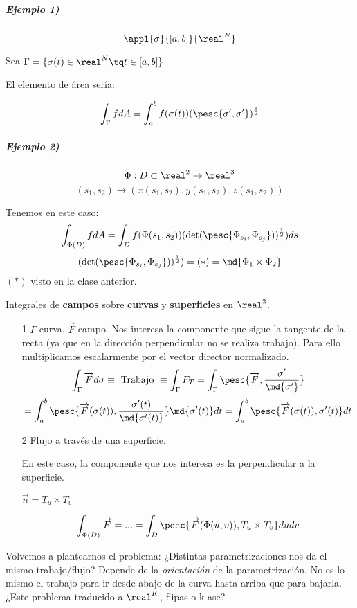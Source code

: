 \subparagraph{Ejemplo 1)}

\[\appl{\sigma}{[a,b]}{\real^N}\]

Sea $\Gamma = \{\sigma(t)\in\real^N\tq t\in[a,b]\}$

El elemento de área sería:

\[\int_{\Gamma} fdA = \int_a^bf(\sigma(t)) (\pesc{\sigma',\sigma'})^{\frac{1}{2}}\]


\subparagraph{Ejemplo 2)}

\[
\Phi : D\subset\real^2\rightarrow \real^3\]
\[(s_1,s_2)\rightarrow (x(s_1,s_2),y(s_1,s_2),z(s_1,s_2))\]

Tenemos en este caso:
\[\int_{\Phi(D)}fdA = \int_D f(\Phi(s_1,s_2)) (\det(\pesc{\Phi_{s_i},\Phi_{s_j}}))^{\frac{1}{2}})ds\]
\[(\det(\pesc{\Phi_{s_i},\Phi_{s_j}}))^{\frac{1}{2}}) = (*) = \md{\Phi_1 \times \Phi_2}\]
$(*)$ visto en la clase anterior.

Integrales de \textbf{campos} sobre \textbf{curvas} y \textbf{superficies} en $\real^3$.

\begin{itemize}
\item[1] $\Gamma$ curva, $\overrightarrow{F}$ campo. Nos interesa la componente que sigue la tangente de la recta (ya que en la dirección perpendicular no se realiza trabajo). Para ello multiplicamos escalarmente por el vector director normalizado.
\[\int_{\Gamma} \overrightarrow{F}d\sigma \equiv \text{ Trabajo } \equiv \int_{\Gamma} F_T = \int_{\Gamma} \pesc{\overrightarrow{F},\frac{\sigma'}{\md{\sigma'}}}\]
\[ = \int_a^b \pesc{\overrightarrow{F}(\sigma(t)),\frac{\sigma'(t)}{\md{\sigma'(t)}}} \md{\sigma'(t)}dt = \int_a^b \pesc{\overrightarrow{F}(\sigma(t)),\sigma'(t)} dt\]

\item[2] Flujo a través de una superficie.

En este caso, la componente que nos interesa es la perpendicular a la superficie.

$\overrightarrow{n} = T_u\times T_v$

\[\int_{\Phi(D)} \overrightarrow{F} = ... = \int_{D} \pesc{\overrightarrow{F}(\Phi(u,v)),T_u\times T_v}dudv\]
\end{itemize}

Volvemos a plantearnos el problema: ¿Distintas parametrizaciones nos da el mismo trabajo/flujo? Depende de la \textit{orientación} de la parametrización. No es lo mismo el trabajo para ir desde abajo de la curva hasta arriba que para bajarla. ¿Este problema traducido a $\real^K$, flipas o k ase?



